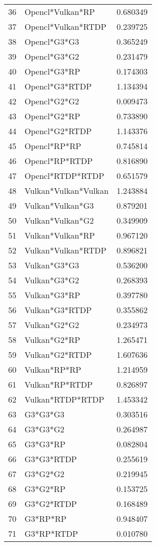 \begin{tabular}{llr}
36 & Opencl*Vulkan*RP & 0.680349 \\
37 & Opencl*Vulkan*RTDP & 0.239725 \\
38 & Opencl*G3*G3 & 0.365249 \\
39 & Opencl*G3*G2 & 0.231479 \\
40 & Opencl*G3*RP & 0.174303 \\
41 & Opencl*G3*RTDP & 1.134394 \\
42 & Opencl*G2*G2 & 0.009473 \\
43 & Opencl*G2*RP & 0.733890 \\
44 & Opencl*G2*RTDP & 1.143376 \\
45 & Opencl*RP*RP & 0.745814 \\
46 & Opencl*RP*RTDP & 0.816890 \\
47 & Opencl*RTDP*RTDP & 0.651579 \\
48 & Vulkan*Vulkan*Vulkan & 1.243884 \\
49 & Vulkan*Vulkan*G3 & 0.879201 \\
50 & Vulkan*Vulkan*G2 & 0.349909 \\
51 & Vulkan*Vulkan*RP & 0.967120 \\
52 & Vulkan*Vulkan*RTDP & 0.896821 \\
53 & Vulkan*G3*G3 & 0.536200 \\
54 & Vulkan*G3*G2 & 0.268393 \\
55 & Vulkan*G3*RP & 0.397780 \\
56 & Vulkan*G3*RTDP & 0.355862 \\
57 & Vulkan*G2*G2 & 0.234973 \\
58 & Vulkan*G2*RP & 1.265471 \\
59 & Vulkan*G2*RTDP & 1.607636 \\
60 & Vulkan*RP*RP & 1.214959 \\
61 & Vulkan*RP*RTDP & 0.826897 \\
62 & Vulkan*RTDP*RTDP & 1.453342 \\
63 & G3*G3*G3 & 0.303516 \\
64 & G3*G3*G2 & 0.264987 \\
65 & G3*G3*RP & 0.082804 \\
66 & G3*G3*RTDP & 0.255619 \\
67 & G3*G2*G2 & 0.219945 \\
68 & G3*G2*RP & 0.153725 \\
69 & G3*G2*RTDP & 0.168489 \\
70 & G3*RP*RP & 0.948407 \\
71 & G3*RP*RTDP & 0.010780 \\

\end{tabular}
